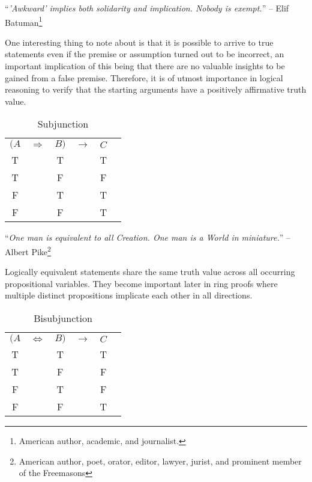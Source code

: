 \begin{displayquote}
    ``\emph{'Awkward' implies both solidarity and implication. Nobody is exempt.}''
    -- Elif Batuman\footnote{American author, academic, and journalist.}
\end{displayquote}

One interesting thing to note about  is that it is
possible to arrive to true statements even if the premise or assumption turned out
to be incorrect, an important implication of this being that there are no valuable
insights to be gained from a false premise. Therefore, it is of utmost importance
in logical reasoning to verify that the starting arguments have a positively affirmative
truth value.

\begin{table}[hbt!]
    \centering
    \begin{tabular}{*{6}{c}}
        $(A$ & $\Rightarrow$ & $B)$ & $\rightarrow$ & $C$ \\
           T &               & T    &               & T   \\
           T &               & F    &               & F   \\
           F &               & T    &               & T   \\
           F &               & F    &               & T   \\
    \end{tabular}
    \caption{Subjunction}\label{table-subjunction}
\end{table}

\begin{displayquote}
    ``\emph{One man is equivalent to all Creation. One man is a World in miniature.}''
    -- Albert Pike\footnote{American author, poet, orator, editor, lawyer, jurist,
    and prominent member of the Freemasons}
\end{displayquote}

Logically equivalent statements share the same truth value across all occurring
propositional variables. They become important later in ring proofs where multiple
distinct propositions implicate each other in all directions.

\begin{table}[hbt!]
    \centering
    \begin{tabular}{*{6}{c}}
        $(A$ & $\Leftrightarrow$ & $B)$ & $\rightarrow$ & $C$ \\
           T &                   & T    &               & T   \\
           T &                   & F    &               & F   \\
           F &                   & T    &               & F   \\
           F &                   & F    &               & T   \\
    \end{tabular}
    \caption{Bisubjunction}\label{table-bisubjunction}
\end{table}

